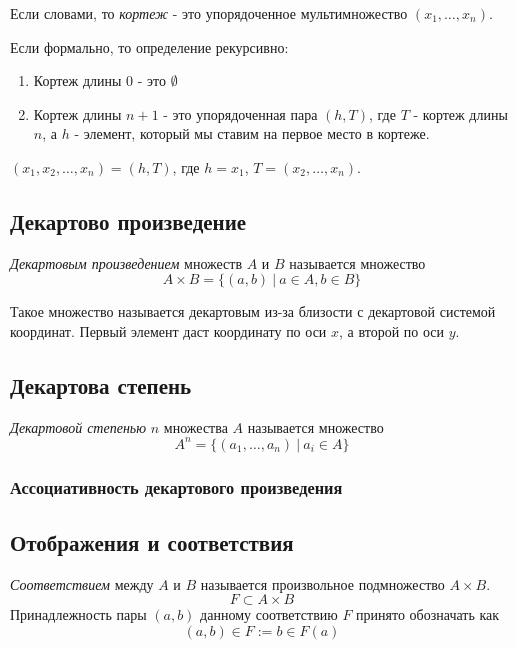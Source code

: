 \begin{definition}
	Если словами, то \textit{кортеж} - это упорядоченное мультимножество $(x_1, \dots, x_n)$.
	
	Если формально, то определение рекурсивно:
	\begin{enumerate}
		\item Кортеж длины 0 - это $\emptyset$
		\item Кортеж длины $n + 1$ - это упорядоченная пара $(h, T)$, где $T$ - кортеж длины $n$, а $h$ - элемент, который мы ставим на первое место в кортеже.
	\end{enumerate}
\end{definition}

\begin{example}
	$(x_1, x_2, \dots, x_n) = (h, T)$, где $h = x_1$, $T = (x_2, \dots, x_n)$.
\end{example}

\subsection{Декартово произведение}

\begin{definition}
	\textit{Декартовым произведением} множеств $A$ и $B$ называется множество
	$$
	A \times B = \{(a, b)\ |\ a \in A, b \in B\}
	$$
\end{definition}

\begin{note}
	Такое множество называется декартовым из-за близости с декартовой системой координат. Первый элемент даст координату по оси $x$, а второй по оси $y$.
\end{note}

\subsection{Декартова степень}

\begin{definition}
	\textit{Декартовой степенью} $n$ множества $A$ называется множество
	$$
	A^n = \{(a_1, \dots, a_n)\ |\ a_i \in A\}
	$$
\end{definition}

\subsubsection{Ассоциативность декартового произведения}

\subsection{Отображения и соответствия}

\begin{definition}
	\textit{Соответствием} между $A$ и $B$ называется произвольное подмножество $A \times B$.
	$$
		F \subset A \times B
	$$
	Принадлежность пары $(a, b)$ данному соответствию $F$ принято обозначать как
	$$
		(a, b) \in F := b \in F(a)
	$$
\end{definition}